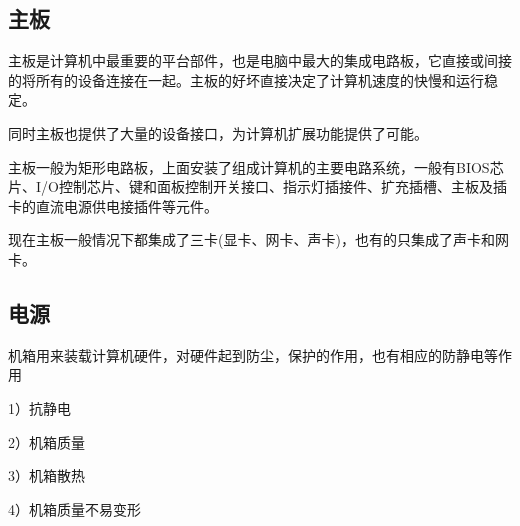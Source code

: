 \subsection{主板}
主板是计算机中最重要的平台部件，也是电脑中最大的集成电路板，它直接或间接的将所有的设备连接在一起。主板的好坏直接决定了计算机速度的快慢和运行稳定。

同时主板也提供了大量的设备接口，为计算机扩展功能提供了可能。

主板一般为矩形电路板，上面安装了组成计算机的主要电路系统，一般有BIOS芯片、I/O控制芯片、键和面板控制开关接口、指示灯插接件、扩充插槽、主板及插卡的直流电源供电接插件等元件。

现在主板一般情况下都集成了三卡(显卡、网卡、声卡)，也有的只集成了声卡和网卡。
\subsection{电源}
机箱用来装载计算机硬件，对硬件起到防尘，保护的作用，也有相应的防静电等作用

1）抗静电

2）机箱质量

3）机箱散热

4）机箱质量不易变形

